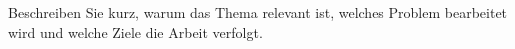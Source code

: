 
Beschreiben Sie kurz, warum das Thema relevant ist, welches Problem bearbeitet
wird und welche Ziele die Arbeit verfolgt.

